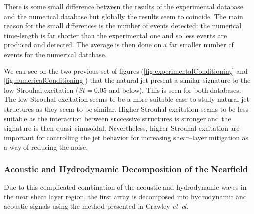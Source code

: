 \documentclass[english]{aiaa-tc}
\newcommand*{\etal}{\textit{et~al}.\ }
\begin{document}
There is some small difference between the results of the experimental database and the numerical database but globally the results seem to coincide. The main reason for the small differences is the number of events detected: the numerical time-length is far shorter than the experimental one and so less events are produced and detected. The average is then done on a far smaller number of events for the numerical database.

We can see on the two previous set of figures (\ref{fig:experimentalConditioning} and \ref{fig:numericalConditioning}) that the natural jet present a similar signature to the low Strouhal excitation ($St = 0.05$ and below). This is seen for both databases. The low Strouhal excitation seems to be a more suitable case to study natural jet structures as they seem to be similar. Higher Strouhal excitation seems to be less suitable as the interaction between successive structures is stronger and the signature is then quasi--sinusoidal. Nevertheless, higher Strouhal excitation are important for controlling the jet behavior for increasing shear--layer mitigation as a way of reducing the noise.

\subsubsection{Acoustic and Hydrodynamic Decomposition of the Nearfield}
Due to this complicated combination of the acoustic and hydrodynamic waves in the near shear layer region, the first array is decomposed into hydrodynamic and acoustic signals using the method presented in Crawley \etal \cite{Crawley2014}

\end{document}

